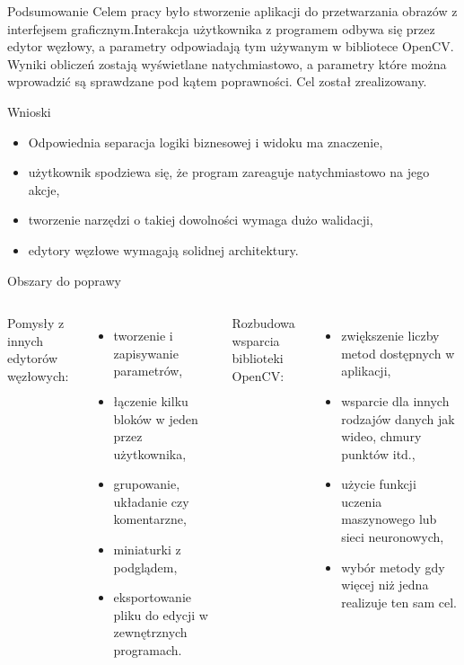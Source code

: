 \documentclass[aspectratio=1610,handout]{beamer}
\theoremstyle{definition}
\begin{document}
\begin{frame}{Podsumowanie}
    Celem pracy było stworzenie aplikacji do przetwarzania obrazów z interfejsem graficznym.Interakcja użytkownika z programem odbywa się przez edytor węzłowy, a parametry odpowiadają tym używanym w bibliotece OpenCV. Wyniki obliczeń zostają wyświetlane natychmiastowo, a parametry które można wprowadzić są sprawdzane pod kątem poprawności. Cel został zrealizowany.
\end{frame}

\begin{frame}{Wnioski}
    \begin{itemize}
        \item Odpowiednia separacja logiki biznesowej i widoku ma znaczenie,
        \item użytkownik spodziewa się, że program zareaguje natychmiastowo na jego akcje,
        \item tworzenie narzędzi o takiej dowolności wymaga dużo walidacji,
        \item edytory węzłowe wymagają solidnej architektury.
    \end{itemize}
\end{frame}

\begin{frame}{Obszary do poprawy}
    \begin{columns}[t]
        Pomysły z innych edytorów węzłowych:
        \begin{itemize}
            \item tworzenie i zapisywanie parametrów,
            \item łączenie kilku bloków w jeden przez użytkownika,
            \item grupowanie, układanie czy komentarzne,
            \item miniaturki z podglądem,
            \item eksportowanie pliku do edycji w zewnętrznych programach.
        \end{itemize}
        Rozbudowa wsparcia biblioteki OpenCV:
        \begin{itemize}
            \item zwiększenie liczby metod dostępnych w aplikacji,
            \item wsparcie dla innych rodzajów danych jak wideo, chmury punktów itd.,
            \item użycie funkcji uczenia maszynowego lub sieci neuronowych,
            \item wybór metody gdy więcej niż jedna realizuje ten sam cel.
        \end{itemize}
    \end{columns}
\end{frame}
\end{document}
